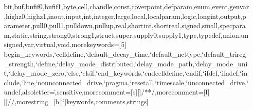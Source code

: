 {{bit,buf,bufif0,bufif1,byte,cell,chandle,const,coverpoint,defparam,enum,event,genvar,highz0,highz1,inout,input,int,integer,large,local,localparam,logic,longint,output,parameter,pull0,pull1,pulldown,pullup,real,shortint,shortreal,signed,small,specparam,static,string,strong0,strong1,struct,super,supply0,supply1,type,typedef,union,unsigned,var,virtual,void},morekeywords=[5]{%
begin_keywords,`celldefine,`default_decay_time,`default_nettype,`default_trireg_strength,`define,`delay_mode_distributed,`delay_mode_path,`delay_mode_unit,`delay_mode_zero,`else,`elsif,`end_keywords,`endcelldefine,`endif,`ifdef,`ifndef,`include,`line,`nounconnected_drive,`pragma,`resetall,`timescale,`unconnected_drive,`undef},alsoletter=\`,sensitive,morecomment=[s][\color{blue!80}]{/*}{*/},morecomment=[l][\color{blue}]//,morestring=[b]“}[keywords,comments,strings]

